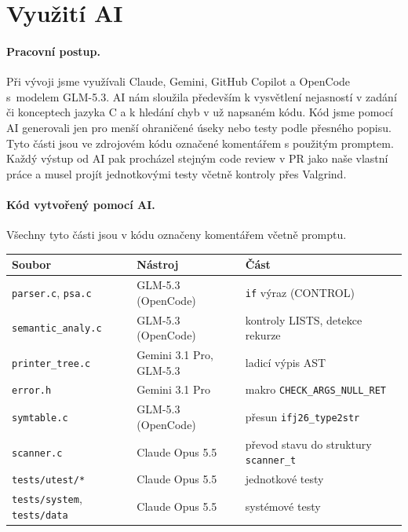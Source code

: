 \documentclass[a4paper,11pt]{article}
\begin{document}
\newpage
\section{Využití AI}




\paragraph{Pracovní postup.}
Při vývoji jsme využívali Claude, Gemini, GitHub Copilot a OpenCode
s~modelem \mbox{GLM-5.3}.
AI nám sloužila především k vysvětlení nejasností v zadání či konceptech
jazyka C a k hledání chyb v už napsaném kódu.
Kód jsme pomocí AI generovali jen pro menší ohraničené úseky nebo testy podle
přesného popisu. Tyto části jsou ve zdrojovém kódu označené komentářem
s použitým promptem. Každý výstup od AI pak procházel stejným code review v PR
jako naše vlastní práce a musel projít jednotkovými testy včetně kontroly přes
Valgrind.

\paragraph{Kód vytvořený pomocí AI.}
Všechny tyto části jsou v kódu označeny komentářem včetně promptu.

\begin{center}
\begin{tabular}{lll}
\textbf{Soubor} & \textbf{Nástroj} & \textbf{Část} \\
\hline
\texttt{parser.c}, \texttt{psa.c} & GLM-5.3 (OpenCode) & \texttt{if} výraz (CONTROL) \\
\texttt{semantic\_analy.c} & GLM-5.3 (OpenCode) & kontroly LISTS, detekce rekurze \\
\texttt{printer\_tree.c} & Gemini 3.1 Pro, GLM-5.3 & ladicí výpis AST \\
\texttt{error.h} & Gemini 3.1 Pro & makro \texttt{CHECK\_ARGS\_NULL\_RET} \\
\texttt{symtable.c} & GLM-5.3 (OpenCode) & přesun \texttt{ifj26\_type2str} \\
\texttt{scanner.c} & Claude Opus 5.5 & převod stavu do struktury \texttt{scanner\_t} \\
\texttt{tests/utest/*} & Claude Opus 5.5 & jednotkové testy \\
\texttt{tests/system}, \texttt{tests/data} & Claude Opus 5.5 & systémové testy \\
\end{tabular}
\end{center}
\end{document}
